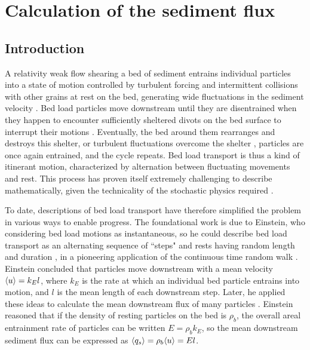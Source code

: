 
\chapter{Calculation of the sediment flux}

\section{Introduction}

A relativity weak flow shearing a bed of sediment entrains individual particles into a state of motion controlled by turbulent forcing and intermittent collisions with other grains at rest on the bed, generating wide fluctuations in the sediment velocity \citep{Heyman2016,Fathel2015}.
Bed load particles move downstream until they are disentrained when they happen to encounter sufficiently sheltered divots on the bed surface to interrupt their motions \citep{Charru2004,Gordon1972}.
Eventually, the bed around them rearranges and destroys this shelter, or turbulent fluctuations overcome the shelter \citep{Celik2019,Valyrakis2014}, particles are once again entrained, and the cycle repeats.
Bed load transport is thus a kind of itinerant motion, characterized by alternation between fluctuating movements and rest.
This process has proven itself extremely challenging to describe mathematically, given the technicality of the stochastic physics required \citep{Pierce2020,Ancey2020}.

To date, descriptions of bed load transport have therefore simplified the problem in various ways to enable progress.
The foundational work is due to Einstein, who considering bed load motions as instantaneous, so he could describe bed load transport as an alternating sequence of ``steps" and rests having random length and duration \citep{Einstein1937}, in a pioneering application of the continuous time random walk \citep{Montroll1965}.
Einstein concluded that particles move downstream with a mean velocity $\langle u \rangle = k_E l$, where $k_E$ is the rate at which an individual bed particle entrains into motion, and $l$ is the mean length of each downstream step.
Later, he applied these ideas to calculate the mean downstream flux of many particles \citep{Einstein1950}. Einstein reasoned that if the density of resting particles on the bed is $\rho_b$, the overall areal entrainment rate of particles can be written $E = \rho_b k_E$, so the mean downstream sediment flux can be expressed as $\langle q_s \rangle = \rho_b \langle u \rangle  = El $.

